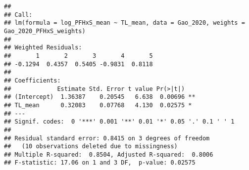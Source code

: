 \documentclass[
]{article}
\newenvironment{Shaded}{\begin{snugshade}}{\end{snugshade}}
\newcommand{\AttributeTok}[1]{\textcolor[rgb]{0.13,0.29,0.53}{#1}}
\newcommand{\CommentTok}[1]{\textcolor[rgb]{0.56,0.35,0.01}{\textit{#1}}}
\newcommand{\DecValTok}[1]{\textcolor[rgb]{0.00,0.00,0.81}{#1}}
\newcommand{\FunctionTok}[1]{\textcolor[rgb]{0.13,0.29,0.53}{\textbf{#1}}}
\newcommand{\NormalTok}[1]{#1}
\newcommand{\OtherTok}[1]{\textcolor[rgb]{0.56,0.35,0.01}{#1}}
\newcommand{\SpecialCharTok}[1]{\textcolor[rgb]{0.81,0.36,0.00}{\textbf{#1}}}
\newcommand{\StringTok}[1]{\textcolor[rgb]{0.31,0.60,0.02}{#1}}
\begin{document}
\begin{Shaded}
\end{Shaded}

\begin{verbatim}
## 
## Call:
## lm(formula = log_PFHxS_mean ~ TL_mean, data = Gao_2020, weights = Gao_2020_PFHxS_weights)
## 
## Weighted Residuals:
##       1       2       3       4       5 
## -0.1294  0.4357  0.5405 -0.9831  0.8118 
## 
## Coefficients:
##             Estimate Std. Error t value Pr(>|t|)   
## (Intercept)  1.36387    0.20545   6.638  0.00696 **
## TL_mean      0.32083    0.07768   4.130  0.02575 * 
## ---
## Signif. codes:  0 '***' 0.001 '**' 0.01 '*' 0.05 '.' 0.1 ' ' 1
## 
## Residual standard error: 0.8415 on 3 degrees of freedom
##   (10 observations deleted due to missingness)
## Multiple R-squared:  0.8504, Adjusted R-squared:  0.8006 
## F-statistic: 17.06 on 1 and 3 DF,  p-value: 0.02575
\end{verbatim}
\end{document}

